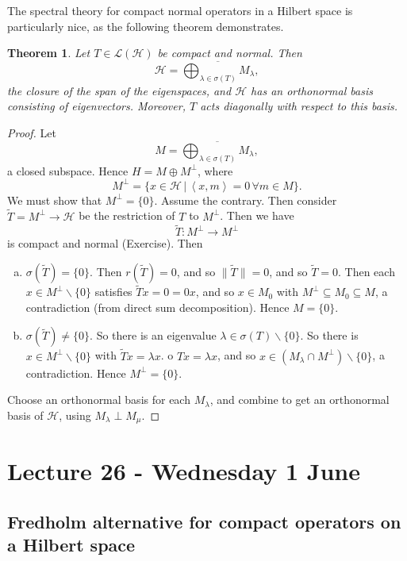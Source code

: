 \documentclass[10pt, reqno, oneside]{amsart}
\theoremstyle{plain}%
\newtheorem{thm}{Theorem}[section]
\theoremstyle{definition}
\theoremstyle{remark}
\newcommand{\given}{ \, | \,}
\newcommand{\iprod}[1]{\left\langle #1 \right\rangle}
\begin{document}
The spectral theory for compact normal operators in a Hilbert space is particularly nice, as the following theorem demonstrates.
\begin{thm}
	Let $T \in \mathcal L(\mathcal H)$ be compact and normal.  Then \[
		\mathcal H = \overline{\bigoplus_{\lambda \in \sigma(T)} M_\lambda},
	\] the closure of the span of the eigenspaces, and $\mathcal H$ has an orthonormal basis consisting of eigenvectors.  Moreover, $T$ acts diagonally with respect to this basis.   
\end{thm}
\begin{proof}
	Let \[
		M = \overline{\bigoplus_{\lambda \in \sigma(T)} M_\lambda},
	\] a closed subspace.  Hence $H = M \oplus M^\perp$, where \[
	M^\perp = \{ x \in \mathcal H \given \iprod{x, m} = 0 \, \forall m \in M \}.
	\]   We must show that $M^\perp = \{ 0 \}$.  Assume the contrary.  Then consider $\tilde T = M^\perp \rightarrow \mathcal H$ be the restriction of $T$ to $M^\perp$.  Then we have \[
		\tilde T: M^\perp \rightarrow M^\perp
	\] is compact and normal (Exercise). Then  \begin{enumerate}[(a)]
		\item $\sigma(\tilde T) = \{ 0 \}$.  Then $r(\tilde T) = 0$, and so $\| \tilde T \| = 0$, and so $\tilde T = 0$.  Then each $x \in M^\perp \backslash \{ 0 \}$ satisfies $\tilde T x = 0 = 0x$, and so $x \in M_0$ with $M^\perp \subseteq M_0 \subseteq M$, a contradiction (from direct sum decomposition).  Hence $M = \{ 0 \}$.  
		\item $\sigma(\tilde T) \neq \{ 0 \}$.  So there is an eigenvalue $\lambda \in \sigma(T) \backslash \{ 0 \}$.  So there is $x \in M^\perp \backslash \{ 0 \}$ with $\tilde T x = \lambda x$.  o $Tx = \lambda x$, and so $x \in (M_\lambda \cap M^\perp) \backslash \{ 0 \}$, a contradiction.  Hence $M^\perp = \{ 0 \}$.    
	\end{enumerate}
	
	Choose an orthonormal basis for each $M_\lambda$, and combine to get an orthonormal basis of $\mathcal H$, using $M_\lambda \perp M_\mu$.  
\end{proof}  




\section{Lecture 26 - Wednesday 1 June} %
\label{sec:lecture_26_wednesday_1_june}
\subsection{Fredholm alternative for compact operators on a Hilbert space} %
\label{sub:fredholm_alternative_for_compact_operators_on_hilbert_space}
\end{document}
